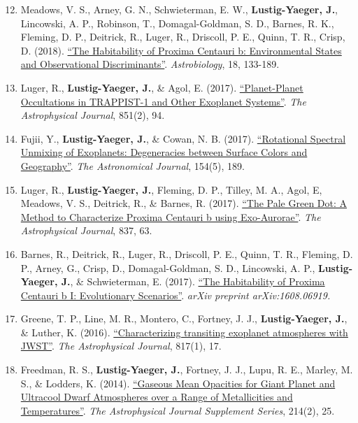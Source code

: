 \documentclass[margin,10pt]{res}
\newenvironment{benumerate}[1]{
    \let\oldItem\item
    \def\item{\addtocounter{enumi}{-2}\oldItem}
    \begin{enumerate}
    \setcounter{enumi}{#1}
    \addtocounter{enumi}{1}
}{
    \end{enumerate}
}
\begin{document}
\begin{resume}
\begin{benumerate}{11}
                    \item Meadows, V. S., Arney, G. N., Schwieterman, E. W., \textbf{Lustig-Yaeger, J.}, Lincowski, A. P., Robinson, T.,  Domagal-Goldman, S. D., Barnes, R. K., Fleming, D. P., Deitrick, R., Luger, R., Driscoll, P. E., Quinn, T. R., Crisp, D. (2018). \href{http://adsabs.harvard.edu/abs/2018AsBio..18..133M}{``The Habitability of Proxima Centauri b: Environmental States and Observational Discriminants''}. \textit{Astrobiology}, 18, 133-189.
                    \item Luger, R., \textbf{Lustig-Yaeger, J.}, \& Agol, E. (2017).  \href{http://adsabs.harvard.edu/abs/2017ApJ...851...94L}{``Planet-Planet Occultations in TRAPPIST-1 and Other Exoplanet Systems''}. \textit{The Astrophysical Journal}, 851(2), 94.
                    \item Fujii, Y., \textbf{Lustig-Yaeger, J.}, \& Cowan, N. B. (2017). \href{http://adsabs.harvard.edu/abs/2017arXiv170804886F}{``Rotational Spectral Unmixing of Exoplanets: Degeneracies between Surface Colors and Geography''}. \textit{The Astronomical Journal}, 154(5), 189.
                    \item Luger, R., \textbf{Lustig-Yaeger, J.}, Fleming, D. P., Tilley, M. A., Agol, E, Meadows, V. S., Deitrick, R., \& Barnes, R. (2017). \href{http://adsabs.harvard.edu/abs/2017ApJ...837...63L}{``The Pale Green Dot: A Method to Characterize Proxima Centauri b using Exo-Aurorae''}. \textit{The Astrophysical Journal}, 837, 63.
                    \item Barnes, R., Deitrick, R., Luger, R., Driscoll, P. E., Quinn, T. R., Fleming, D. P., Arney, G., Crisp, D., Domagal-Goldman, S. D., Lincowski, A. P., \textbf{Lustig-Yaeger, J.}, \& Schwieterman, E. (2017). \href{http://adsabs.harvard.edu/cgi-bin/bib_query?arXiv:1608.06919}{``The Habitability of Proxima Centauri b I: Evolutionary Scenarios''}. \textit{arXiv preprint arXiv:1608.06919.}
                    \item Greene, T. P., Line, M. R., Montero, C., Fortney, J. J., \textbf{Lustig-Yaeger, J.}, \& Luther, K. (2016). \href{http://adsabs.harvard.edu/abs/2016ApJ...817...17G}{``Characterizing transiting exoplanet atmospheres with JWST''}. \textit{The Astrophysical Journal}, 817(1), 17.
                    \item Freedman, R. S., \textbf{Lustig-Yaeger, J.}, Fortney, J. J., Lupu, R. E., Marley, M. S., \& Lodders, K. (2014). \href{http://adsabs.harvard.edu/abs/2014ApJS..214...25F}{``Gaseous Mean Opacities for Giant Planet and Ultracool Dwarf Atmospheres over a Range of Metallicities and Temperatures''}. \textit{The Astrophysical Journal Supplement Series}, 214(2), 25.

\end{benumerate}
\end{resume}
\end{document}
